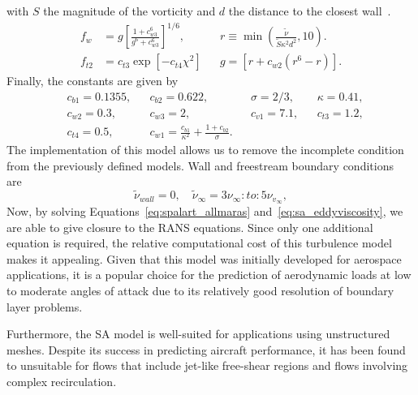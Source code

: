 with $S$ the magnitude of the vorticity and $d$ the distance to the closest wall~\cite{spalartOneequationTurbulenceModel1992}. 
\begin{align}
    f_w&=g
    \left[\frac{1+c_{w3}^6}{g^6+c_{w3}^6}\right]^{1/6},& &r\equiv \min\left(\frac{\tilde\nu}{\tilde S \kappa^2 d^2},10\right). \\
    f_{t2}&=c_{t3} \exp \left[-c_{t4}\chi^2\right] & &g=\left[r+c_{w2}\left(r^6-r\right)\right].
\end{align}
Finally, the constants are given by 
\begin{align}
    &c_{b1} = 0.1355,& &c_{b2} =0.622,& &\sigma = 2/3,& &\kappa=0.41, \\
    &c_{w2} = 0.3,&    &c_{w3} =2,&     &c_{v1} = 7.1,&   &c_{t3}=1.2,  \\
    &c_{t4} = 0.5,&      &c_{w1} = \frac{c_{b1}}{\kappa^2} + \frac{1+c_{b2}}{\sigma}.
\end{align}
The implementation of this model allows us to remove the incomplete condition from the previously defined models. Wall and freestream boundary conditions are~\cite{rumseyRecentDevelopmentsTurbulence2015}
\begin{equation}
    \tilde \nu_{wall} = 0,\quad \tilde\nu_{\infty}=3 \nu_{\infty}:to:5\nu_{v_\infty},
\end{equation}
Now, by solving Equations~\ref{eq:spalart_allmaras} and~\ref{eq:sa_eddyviscosity}, we are able to give closure to the RANS equations. Since only one additional equation is required, the relative computational cost of this turbulence model makes it appealing. Given that this model was initially developed for aerospace applications, it is a popular choice for the prediction of aerodynamic loads at low to moderate angles of attack due to its relatively good resolution of boundary layer problems. 

Furthermore, the SA model is well-suited for applications using unstructured meshes. Despite its success in predicting aircraft performance, it has been found to unsuitable for flows that include jet-like free-shear regions and flows involving complex recirculation.
